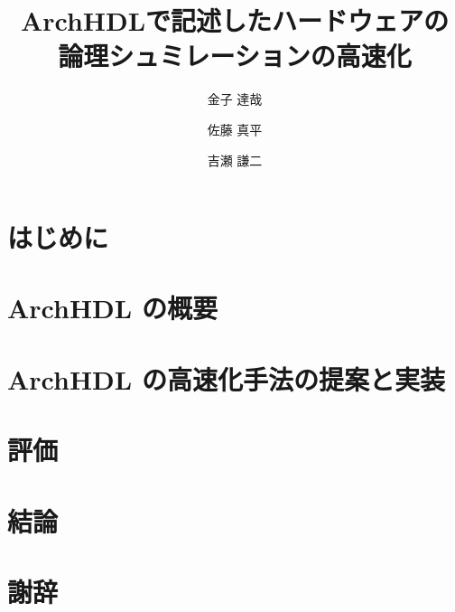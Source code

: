 \documentclass[submit,techreq,noauthor,papersize,]{ipsj}
\title{ArchHDLで記述したハードウェアの\\ 論理シュミレーションの高速化}
\author{金子 達哉}{Kaneko Tatsuya}{TOKYOTECH_B}[kaneko@arch.cs.titech.ac.jp]
\author{佐藤 真平}{Sato Shimpei}{TOKYOTECH}[satos@arch.cs.titech.ac.jp]
\author{吉瀬 謙二}{Kise Kenji}{TOKYOTECH}[kise@cs.titech.ac.jp]
\author{}
\date{}
\begin{document}
\begin{abstract}
 
\end{abstract}

\maketitle

\section{はじめに}



\section{ArchHDL の概要}

\label{s:summary}



\section{ArchHDL の高速化手法の提案と実装}

\label{s:method}



\section{評価}

\label{s:evaluation}



\section{結論}

\label{s:conclusion}



\section{謝辞}

\label{s:acknowledgment}




\end{document}
